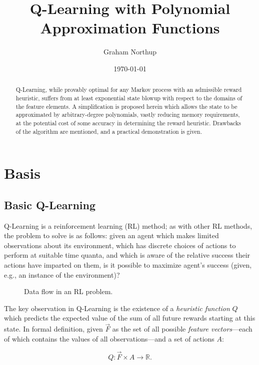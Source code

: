 \documentclass{article}
\begin{document}
\title{Q-Learning with Polynomial Approximation Functions}
\author{Graham Northup}
\date{\today}
\maketitle

\begin{abstract}
	Q-Learning, while provably optimal for any Markov process with an
	admissible reward heuristic, suffers from at least exponential state blowup
	with respect to the domains of the feature elements. A simplification is
	proposed herein which allows the state to be approximated by
	arbitrary-degree polynomials, vastly reducing memory requirements, at the
	potential cost of some accuracy in determining the reward heuristic.
	Drawbacks of the algorithm are mentioned, and a practical demonstration is
	given.
\end{abstract}

\section{Basis}

\subsection{Basic Q-Learning}

	Q-Learning is a reinforcement learning (RL) method; as with other RL
	methods, the problem to solve is as follows: given an agent which makes
	limited observations about its environment, which has discrete choices of
	actions to perform at suitable time quanta, and which is aware of the
	relative success their actions have imparted on them, is it possible to
	maximize agent's success (given, e.g., an instance of the environment)?

	\begin{figure}[b]
		\caption{Data flow in an RL problem.}
		\centering
		\def\svgwidth{8cm}
		
	\end{figure}

	The key observation in Q-Learning is the existence of a {\it heuristic
	function} $Q$ which predicts the expected value of the sum of all future
	rewards starting at this state. In formal definition, given $\vec{F}$ as
	the set of all possible {\it feature vectors}---each of which contains the
	values of all observations---and a set of actions $A$:

	$$
	Q: \vec{F} \times A \rightarrow \mathbb{R}.
	$$
\end{document}
